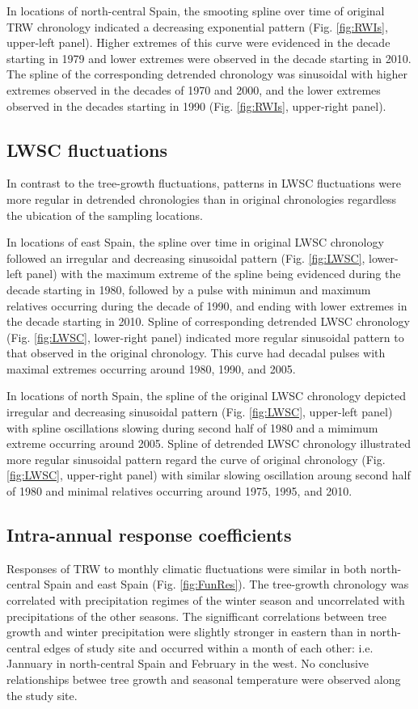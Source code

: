 \documentclass[review,authoryear]{elsarticle}
\begin{document}
In locations of north-central Spain, the smooting spline over time of
original \gls{TRW} chronology indicated a decreasing exponential
pattern (Fig. \ref{fig:RWIs}, upper-left panel). Higher extremes of
this curve were evidenced in the decade starting in 1979 and lower
extremes were observed in the decade starting in 2010. The spline of
the corresponding detrended chronology was sinusoidal with higher
extremes observed in the decades of 1970 and 2000, and the lower
extremes observed in the decades starting in 1990
(Fig. \ref{fig:RWIs}, upper-right panel).

\subsection{\acrlong{LWSC} fluctuations}
In contrast to the tree-growth fluctuations, patterns in \acrfull{LWSC}
fluctuations were more regular in detrended chronologies than in
original chronologies regardless the ubication of the sampling
locations.

In locations of east Spain, the spline over time in original
\gls{LWSC} chronology followed an irregular and decreasing sinusoidal
pattern (Fig. \ref{fig:LWSC}, lower-left panel) with the maximum
extreme of the spline being evidenced during the decade starting in
1980, followed by a pulse with minimun and maximum relatives occurring
during the decade of 1990, and ending with lower extremes in the
decade starting in 2010.  Spline of corresponding detrended \gls{LWSC}
chronology (Fig. \ref{fig:LWSC}, lower-right panel) indicated more
regular sinusoidal pattern to that observed in the original
chronology. This curve had decadal pulses with maximal extremes
occurring around 1980, 1990, and 2005.

In locations of north Spain, the spline of the original \gls{LWSC}
chronology depicted irregular and decreasing sinusoidal pattern
(Fig. \ref{fig:LWSC}, upper-left panel) with spline oscillations
slowing during second half of 1980 and a mimimum extreme occurring
around 2005. Spline of detrended \gls{LWSC} chronology illustrated
more regular sinusoidal pattern regard the curve of original
chronology (Fig. \ref{fig:LWSC}, upper-right panel) with similar
slowing oscillation aroung second half of 1980 and minimal relatives
occurring around 1975, 1995, and 2010.

\subsection{Intra-annual response coefficients}
Responses of \gls{TRW} to monthly climatic fluctuations were
similar in both north-central Spain and east Spain
(Fig. \ref{fig:FunRes}). The tree-growth chronology was correlated
with precipitation regimes of the winter season and uncorrelated with
precipitations of the other seasons. The signifficant correlations
between tree growth and winter precipitation were slightly stronger in
eastern than in north-central edges of study site and occurred within
a month of each other: i.e. Jannuary in north-central Spain and
February in the west. No conclusive relationships betwee tree growth
and seasonal temperature were observed along the study site.
\end{document}
